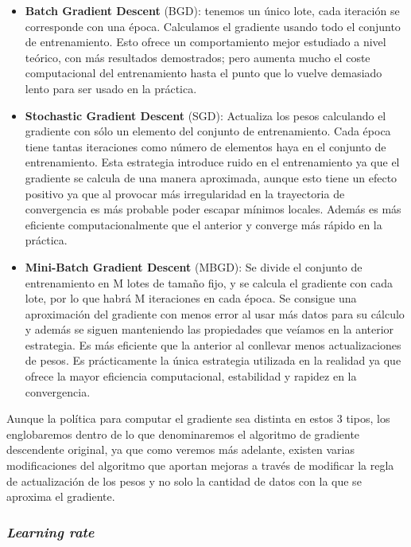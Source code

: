 \begin{itemize}
    \item \textbf{Batch Gradient Descent} (BGD): tenemos un único lote, cada iteración se corresponde con una época. Calculamos el gradiente usando todo el conjunto de entrenamiento. Esto ofrece un comportamiento mejor estudiado a nivel teórico, con más resultados demostrados; pero aumenta mucho el coste computacional del entrenamiento hasta el punto que lo vuelve demasiado lento para ser usado en la práctica.

    \item \textbf{Stochastic Gradient Descent} (SGD): Actualiza los pesos calculando el gradiente con sólo un elemento del conjunto de entrenamiento. Cada época tiene tantas iteraciones como número de elementos haya en el conjunto de entrenamiento. Esta estrategia introduce ruido en el entrenamiento ya que el gradiente se calcula de una manera aproximada, aunque esto tiene un efecto positivo ya que al provocar más irregularidad en la trayectoria de convergencia es más probable poder escapar mínimos locales. Además es más eficiente computacionalmente que el anterior y converge más rápido en la práctica.

    \item \textbf{Mini-Batch Gradient Descent} (MBGD): Se divide el conjunto de entrenamiento en M lotes de tamaño fijo, y se calcula el gradiente con cada lote, por lo que habrá M iteraciones en cada época. Se consigue una aproximación del gradiente con menos error al usar más datos para su cálculo y además se siguen manteniendo las propiedades que veíamos en la anterior estrategia. Es más eficiente que la anterior al conllevar menos actualizaciones de pesos. Es prácticamente la única estrategia utilizada en la realidad ya que ofrece la mayor eficiencia computacional, estabilidad y rapidez en la convergencia.
\end{itemize}

Aunque la política para computar el gradiente sea distinta en estos 3 tipos, los englobaremos dentro de lo que denominaremos el algoritmo de gradiente descendente original, ya que como veremos más adelante, existen varias modificaciones del algoritmo que aportan mejoras a través de modificar la regla de actualización de los pesos y no solo la cantidad de datos con la que se aproxima el gradiente.

\subsubsection{\textit{Learning rate}}

